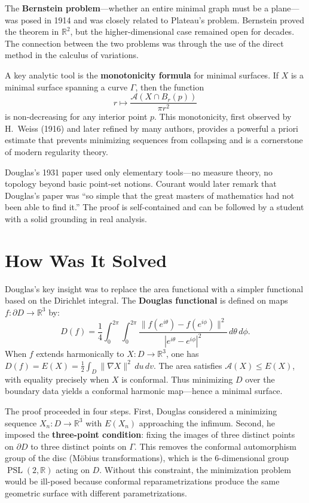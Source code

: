 The \textbf{Bernstein problem}---whether an entire minimal graph must be
a plane---was posed in 1914 and was closely related to Plateau's
problem. Bernstein proved the theorem in $\mathbb{R}^2$, but the
higher-dimensional case remained open for decades. The connection
between the two problems was through the use of the direct method in the
calculus of variations.

A key analytic tool is the \textbf{monotonicity formula} for minimal
surfaces. If $X$ is a minimal surface spanning a curve $\Gamma$, then
the function
\[
r \mapsto \frac{\mathcal{A}(X \cap B_r(p))}{\pi r^2}
\]
is non-decreasing for any interior point $p$. This monotonicity, first
observed by H.~Weiss (1916) and later refined by many authors, provides
a powerful a priori estimate that prevents minimizing sequences from
collapsing and is a cornerstone of modern regularity theory.

Douglas's 1931 paper used only elementary tools---no measure theory, no
topology beyond basic point-set notions. Courant would later remark that
Douglas's paper was ``so simple that the great masters of mathematics
had not been able to find it.'' The proof is self-contained and can be
followed by a student with a solid grounding in real analysis.

\section{How Was It Solved}

Douglas's key insight was to replace the area functional with a simpler
functional based on the Dirichlet integral. The \textbf{Douglas
functional} is defined on maps $f: \partial D \to \mathbb{R}^3$ by:
\[
D(f) = \frac{1}{4} \int_0^{2\pi} \int_0^{2\pi}
\frac{\|f(e^{i\theta}) - f(e^{i\phi})\|^2}
     {|e^{i\theta} - e^{i\phi}|^2} \, d\theta \, d\phi.
\]
When $f$ extends harmonically to $X: D \to \mathbb{R}^3$, one has
$D(f) = E(X) = \frac{1}{2}\int_D \|\nabla X\|^2\,du\,dv$. The area
satisfies $\mathcal{A}(X) \leq E(X)$, with equality precisely when $X$
is conformal. Thus minimizing $D$ over the boundary data yields a
conformal harmonic map---hence a minimal surface.

The proof proceeded in four steps. First, Douglas considered a
minimizing sequence $X_n: D \to \mathbb{R}^3$ with $E(X_n)$ approaching
the infimum. Second, he imposed the \textbf{three-point condition}:
fixing the images of three distinct points on $\partial D$ to three
distinct points on $\Gamma$. This removes the conformal automorphism
group of the disc (M\"{o}bius transformations), which is the
6-dimensional group $\operatorname{PSL}(2,\mathbb{R})$ acting on $D$.
Without this constraint, the minimization problem would be ill-posed
because conformal reparametrizations produce the same geometric surface
with different parametrizations.

